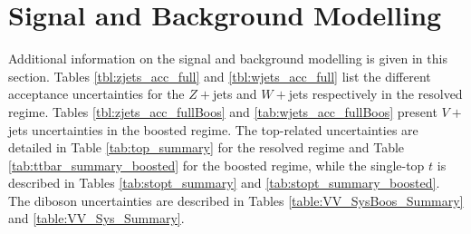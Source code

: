 \section{Signal and Background Modelling}\label{appsec-vh-backsigmod}
Additional information on the signal and background modelling is given in this section. Tables \ref{tbl:zjets_acc_full} and \ref{tbl:wjets_acc_full} list the different acceptance uncertainties for the $Z+$jets and $W+$jets respectively in the resolved regime. Tables \ref{tbl:zjets_acc_fullBoos} and \ref{tab:wjets_acc_fullBoos} present $V+$jets uncertainties in the boosted regime. The top-related uncertainties are detailed in Table \ref{tab:top_summary} for the resolved regime and Table \ref{tab:ttbar_summary_boosted} for the boosted regime, while the single-top $t$ is described in Tables \ref{tab:stopt_summary} and \ref{tab:stopt_summary_boosted}. The diboson uncertainties are described in Tables \ref{table:VV_SysBoos_Summary} and \ref{table:VV_Sys_Summary}.










